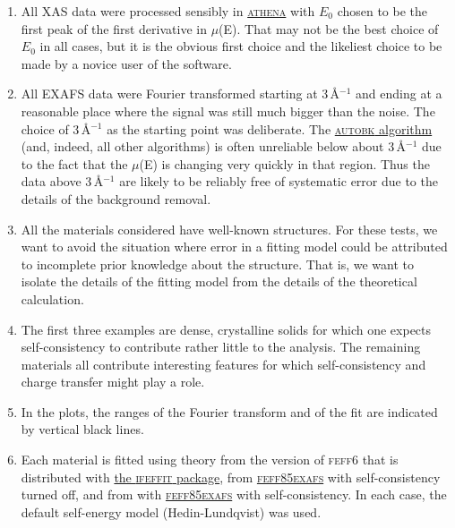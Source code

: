 \documentclass[11pt]{article}
\begin{document}
\begin{enumerate}
\item All XAS data were processed sensibly in
  \href{http://bruceravel.github.io/demeter/}{\textsc{athena}} with $E_0$
  chosen to be the first peak of the first derivative in
  $\mu$(E). That may not be the best choice of $E_0$ in all cases, but it
  is the obvious first choice and the likeliest choice to be made by a
  novice user of the software.

\item All EXAFS data were Fourier transformed starting at
  3\,{\AA}$^{-1}$ and ending at a reasonable place where the signal
  was still much bigger than the noise. The choice of 3\,{\AA}$^{-1}$
  as the starting point was deliberate.  The
  \href{http://dx.doi.org/10.1103/PhysRevB.47.14126}{\textsc{autobk}
    algorithm} (and, indeed, all other algorithms) is often unreliable
  below about 3\,{\AA}$^{-1}$ due to the fact that the $\mu$(E) is
  changing very quickly in that region.  Thus the data above
  3\,{\AA}$^{-1}$ are likely to be reliably free of systematic error
  due to the details of the background removal.

\item All the materials considered have well-known structures. For
  these tests, we want to avoid the situation where error in a fitting
  model could be attributed to incomplete prior knowledge about the
  structure. That is, we want to isolate the details of the fitting
  model from the details of the theoretical calculation.

\item The first three examples are dense, crystalline solids for which
  one expects self-consistency to contribute rather little to the
  analysis.  The remaining materials all contribute interesting
  features for which self-consistency and charge transfer might play a
  role.

\item In the plots, the ranges of the Fourier transform and of the fit
  are indicated by vertical black lines.

\item Each material is fitted using theory from the version of
  \textsc{feff6} that is distributed with
  \href{https://github.com/newville/ifeffit}{the \textsc{ifeffit}
    package}, from
  \href{https://github.com/xraypy/feff85exafs}{\textsc{feff85exafs}}
  with self-consistency turned off, and from with
  \href{https://github.com/xraypy/feff85exafs}{\textsc{feff85exafs}}
  with self-consistency. In each case, the default self-energy model
  (Hedin-Lundqvist) was used.


\end{enumerate}
\end{document}
